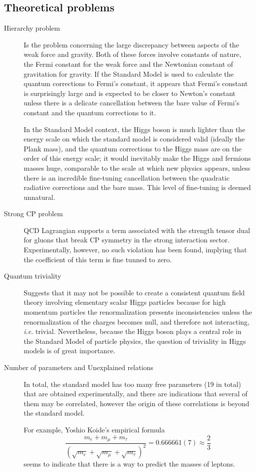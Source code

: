 \subsection{Theoretical problems}

\begin{description}
    \item[Hierarchy problem] Is the problem concerning the large discrepancy between aspects of the weak force and gravity. Both of these forces involve constants of nature, the Fermi constant for the weak force and the Newtonian constant of gravitation for gravity. If the Standard Model is used to calculate the quantum corrections to Fermi's constant, it appears that Fermi's constant is surprisingly large and is expected to be closer to Newton's constant unless there is a delicate cancellation between the bare value of Fermi's constant and the quantum corrections to it. 
    
    In the Standard Model context, the Higgs boson is much lighter than the energy scale on which the standard model is considered valid (ideally the Plank mass), and the quantum corrections to the Higgs mass are on the order of this energy scale; it would inevitably make the Higgs and fermions masses huge, comparable to the scale at which new physics appears, unless there is an incredible fine-tuning cancellation between the quadratic radiative corrections and the bare mass. This level of fine-tuning is deemed unnatural.

    \item[Strong CP problem] QCD Lagrangian supports a term associated with the strength tensor dual for gluons that break CP symmetry in the strong interaction sector. Experimentally, however, no such violation has been found, implying that the coefficient of this term is fine tunned to zero. 
    \item[Quantum triviality] Suggests that it may not be possible to create a consistent quantum field theory involving elementary scalar Higgs particles because for high momentum particles the renormalization presents inconsistencies unless the renormalization of the charges becomes null, and therefore not interacting, \textit{i.e.} trivial. Nevertheless, because the Higgs boson plays a central role in the Standard Model of particle physics, the question of triviality in Higgs models is of great importance. 
    \item[Number of parameters and Unexplained relations] In total, the standard model has too many free parameters (19 in total) that are obtained experimentally, and there are indications that several of them may be correlated, however the origin of these correlations is beyond the standard model.
    
    For example, Yoshio Koide's empirical formula~\parencite{0505220}
    $$
    \frac{m_{e}+m_{\mu}+m_{\tau}}{\left(\sqrt{m_{e}}+\sqrt{m_{\mu}}+\sqrt{m_{\tau}}\right)^{2}}=0.666661(7) \approx \frac{2}{3}
    $$
    seems to indicate that there is a way to predict the masses of leptons.
    
\end{description}
